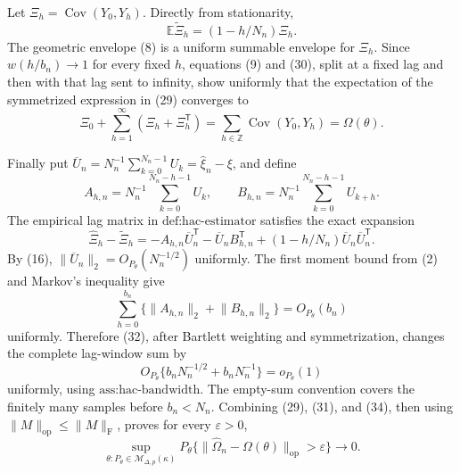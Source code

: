 Let \(\Xi_h=\operatorname{Cov}(Y_0,Y_h)\).  Directly from stationarity,
\[
 \mathbb E\widetilde\Xi_h=(1-h/N_n)\Xi_h.
\tag{30}
\]
The geometric envelope (8) is a uniform summable envelope for \(\Xi_h\).  Since \(w(h/b_n)\to1\) for every fixed \(h\), equations (9) and (30), split at a fixed lag and then with that lag sent to infinity, show uniformly that the expectation of the symmetrized expression in (29) converges to
\[
 \Xi_0+\sum_{h=1}^\infty(\Xi_h+\Xi_h^{\mathsf T})
 =\sum_{h\in\mathbb Z}\operatorname{Cov}(Y_0,Y_h)=\Omega(\theta).
\tag{31}
\]

Finally put \(\overline U_n=N_n^{-1}\sum_{k=0}^{N_n-1}U_k=\widehat\xi_n-\xi\), and define
\[
 A_{h,n}=N_n^{-1}\sum_{k=0}^{N_n-h-1}U_k,
 \qquad
 B_{h,n}=N_n^{-1}\sum_{k=0}^{N_n-h-1}U_{k+h}.
\]
The empirical lag matrix in \(\text{def:hac-estimator}\) satisfies the exact expansion
\[
 \widehat\Xi_h-\widetilde\Xi_h
 =-A_{h,n}\overline U_n^{\mathsf T}
  -\overline U_nB_{h,n}^{\mathsf T}
  +(1-h/N_n)\overline U_n\overline U_n^{\mathsf T}.
\tag{32}
\]
By (16), \(\lVert\overline U_n\rVert_2=O_{P_\theta}(N_n^{-1/2})\) uniformly.  The first moment bound from (2) and Markov's inequality give
\[
 \sum_{h=0}^{b_n}\{\lVert A_{h,n}\rVert_2+\lVert B_{h,n}\rVert_2\}=O_{P_\theta}(b_n)
\tag{33}
\]
uniformly.  Therefore (32), after Bartlett weighting and symmetrization, changes the complete lag-window sum by
\[
 O_{P_\theta}\{b_nN_n^{-1/2}+b_nN_n^{-1}\}=o_{P_\theta}(1)
\tag{34}
\]
uniformly, using \(\text{ass:hac-bandwidth}\).  The empty-sum convention covers the finitely many samples before \(b_n<N_n\).  Combining (29), (31), and (34), then using \(\lVert M\rVert_{\mathrm{op}}\leq\lVert M\rVert_{\mathrm F}\), proves for every \(\varepsilon>0\),
\[
 \sup_{\theta:P_\theta\in\mathcal M_{\Delta,p}(\kappa)}
 P_\theta\{\lVert\widehat\Omega_n-\Omega(\theta)\rVert_{\mathrm{op}}>\varepsilon\}
 \longrightarrow0.
\]
